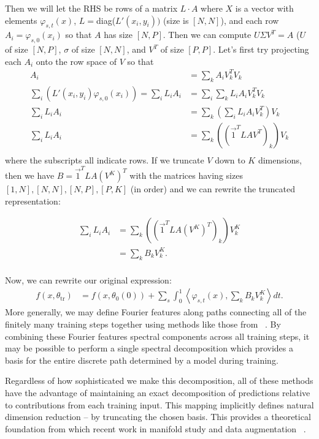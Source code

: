 Then we will let the RHS be rows of a matrix $L \cdot A$ where $X$ is a vector with elements $\varphi_{s,t}(x)$, $L =
$diag($L'(x_i, y_i))$ (size is $[N, N]$), and each row $A_i
= \varphi_{s,0}(x_i)$ so that $A$ has size $[N, P]$. Then we can compute $U\Sigma V^T =
A$ ($U$ of size $[N, P]$, $\sigma$ of size $[N, N]$, and $V^T$ of size $[P, P]$. Let's first try projecting each $A_i$ onto the row space of $V$ so that 
\begin{align}
    A_i &= \sum_k A_i V_k^T V_k \\
    \sum_i \left(L'(x_i, y_i) \varphi_{s, 0}(x_i)\right) = \sum_i L_i A_i &= \sum_i \sum_k L_i A_i V_k^T V_k\\
    \sum_i L_i A_i &= \sum_k \left(\sum_i L_i A_i V_k^T\right) V_k\\
    \sum_i L_i A_i &= \sum_k \left((\vec 1^T L A V^T)_k\right) V_k\\
\end{align}
where the subscripts all indicate rows. 
If we truncate  $V$ down to $K$ dimensions, then we have $B = \vec 1^T L A (V^K)^T$ with the matrices having sizes $[1,N], [N,N], [N,P], [P,K]$ (in order) and we can rewrite the truncated representation:

\begin{align}
    \sum_i L_i A_i &= \sum_k \left((\vec 1^T L A (V^K)^T)_k\right) V^K_k\\
    &= \sum_k B_k V^K_k.\\
\end{align}

Now, we can rewrite our original expression:
\begin{align}
     f(x, \theta_\text{tr}) &= f(x, \theta_0(0)) +  \sum_s
\int_0^1                                  \left\langle 
                                   \varphi_{s,t}(x) ,  \sum_k B_k V^K_k \right \rangle dt.
 \end{align}
More generally, we may define Fourier features along paths connecting all of the finitely many training steps together using methods like those from ~\citet{tancik2020fourierfeatures}. By combining these Fourier features spectral components across all training steps, it may be possible to perform a single spectral decomposition which provides a basis for the entire discrete path determined by a model during training. 

Regardless of how sophisticated we make this decomposition, all of
these methods have the advantage of maintaining an exact decomposition of predictions relative to contributions from each training input. This mapping implicitly
defines natural dimension reduction -- by truncating the chosen
basis. This provides a theoretical foundation
from which recent work in manifold study and data augmentation
~\citep{kaufman_data_2023, liu_linear_2023, sipka_differentiable_2023,
  cha_orthogonality-enforced_2023, marbut_reliable_2023,
  gao_out--domain_2023, oh_provable_2023, chen2023aware}.


